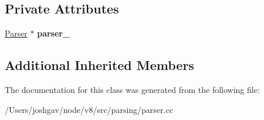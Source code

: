 \subsection*{Private Attributes}
\begin{DoxyCompactItemize}
\item 
\hyperlink{classv8_1_1internal_1_1_parser}{Parser} $\ast$ {\bfseries parser\+\_\+}\hypertarget{classv8_1_1internal_1_1_non_pattern_rewriter_ab376663afacbf0a0f21d215c70ed33ea}{}\label{classv8_1_1internal_1_1_non_pattern_rewriter_ab376663afacbf0a0f21d215c70ed33ea}

\end{DoxyCompactItemize}
\subsection*{Additional Inherited Members}


The documentation for this class was generated from the following file\+:\begin{DoxyCompactItemize}
\item 
/\+Users/joshgav/node/v8/src/parsing/parser.\+cc\end{DoxyCompactItemize}
